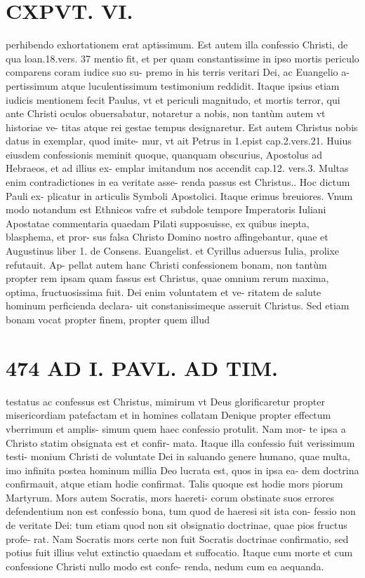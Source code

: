 \documentclass{article}
\begin{document}
\begin{pages}
\section*{CXPVT. VI. }
\marginpar{[ p.473 ]}\pstart perhibendo exhortationem erat aptissimum. Est autem illa confessio Christi, de qua loan.18.vers. 37 mentio fit, et per quam constantissime in ipso mortis periculo comparens coram iudice suo su- premo in his terris veritari Dei, ac Euangelio a- pertissimum atque luculentissimum testimonium reddidit. Itaque ipsius etiam iudicis mentionem fecit Paulus, vt et periculi magnitudo, et mortis terror, qui ante Christi oculos obuersabatur, notaretur a nobis, non tantùm autem vt historiae ve- titas atque  rei gestae tempus designaretur. Est autem Christus nobis datus in exemplar, quod imite- mur, vt ait Petrus in 1.epist cap.2.vers.21. Huius eiusdem confessionis meminit quoque, quanquam obscurius, Apostolus ad Hebraeos, et ad illius ex- emplar imitandum nos accendit cap.12. vers.3. Multas enim contradictiones in ea veritate asse- renda passus est Christus.. Hoc dictum Pauli ex- plicatur in articulis Symboli Apostolici. Itaque erimus breuiores. Vnum modo notandum est Ethnicos vafre et subdole tempore Imperatoris Iuliani Apostatae commentaria quaedam Pilati supposuisse, ex quibus inepta, blasphema, et pror- sus falsa Christo Domino nostro affingebantur, quae et Augustinus liber 1. de Consens. Euangelist. et Cyrillus aduersus Iulia, prolixe refutauit. Ap- pellat autem hanc Christi confessionem bonam, non tantùm propter rem ipsam quam fassus est Christus, quae omnium rerum maxima, optima, fructuosissima fuit. Dei enim voluntatem et ve- ritatem de salute hominum perficienda declara- uit constanissimeque asseruit Christus. Sed etiam bonam vocat propter finem, propter quem illud  \pend
\section*{474 AD I. PAVL. AD TIM. }
\marginpar{[ p.]}\pstart testatus ac confessus est Christus, mimirum vt Deus glorificaretur propter misericordiam patefactam et in homines collatam Denique propter effectum vberrimum et amplis- simum quem haec confessio protulit. Nam mor- te ipsa a Christo statim obsignata est et confir- mata. Itaque illa confessio fuit verissimum testi- monium Christi de voluntate Dei in saluando genere humano, quae multa, imo infinita postea hominum millia Deo lucrata est, quos in ipsa ea- dem doctrina confirmauit, atque etiam hodie confirmat. Talis quoque est hodie mors piorum Martyrum. Mors autem Socratis, mors haereti- corum obstinate suos errores defendentium non est confessio bona, tum quod de haeresi sit ista con- fessio non de veritate Dei: tum etiam quod non sit obsignatio doctrinae, quae pios fructus profe- rat. Nam Socratis mors certe non fuit Socratis doctrinae confirmatio, sed potius fuit illius velut extinctio quaedam et suffocatio. Itaque cum morte et cum confessione Christi nullo modo est confe- renda, nedum cum ea aequanda.  \pend
{}
{}

\end{pages}
\end{document}
